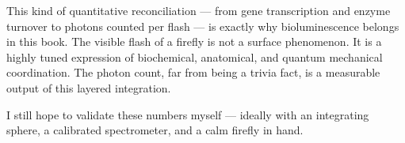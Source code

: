 \begin{commentary}
This kind of quantitative reconciliation — from gene transcription and enzyme turnover to photons counted per flash — is exactly why bioluminescence belongs in this book. The visible flash of a firefly is not a surface phenomenon. It is a highly tuned expression of biochemical, anatomical, and quantum mechanical coordination. The photon count, far from being a trivia fact, is a measurable output of this layered integration.

I still hope to validate these numbers myself — ideally with an integrating sphere, a calibrated spectrometer, and a calm firefly in hand.
\end{commentary}
